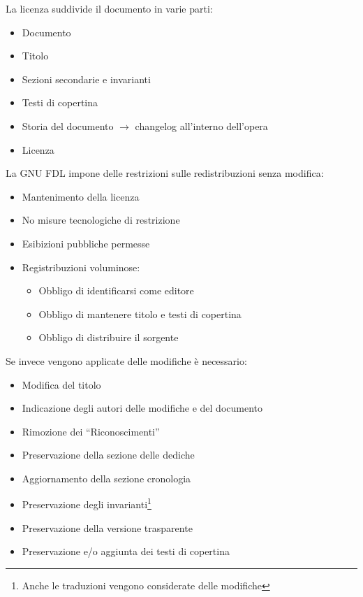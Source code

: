 La licenza suddivide il documento in varie parti:
\begin{itemize}
  
\item Documento
\item Titolo
\item Sezioni secondarie e invarianti
\item Testi di copertina
\item Storia del documento $\to$ changelog all'interno dell'opera
\item Licenza
  
\end{itemize}

La GNU FDL impone delle restrizioni sulle redistribuzioni senza modifica:
\begin{itemize}

\item Mantenimento della licenza
\item No misure tecnologiche di restrizione
\item Esibizioni pubbliche permesse
\item Registribuzioni voluminose:
  \begin{itemize}

  \item Obbligo di identificarsi come editore
  \item Obbligo di mantenere titolo e testi di copertina
  \item Obbligo di distribuire il sorgente

  \end{itemize}

\end{itemize}

Se invece vengono applicate delle modifiche \`e necessario:
\begin{itemize}

\item Modifica del titolo
\item Indicazione degli autori delle modifiche e del documento
\item Rimozione dei ``Riconoscimenti''
\item Preservazione della sezione delle dediche
\item Aggiornamento della sezione cronologia
\item Preservazione degli invarianti\footnote{Anche le traduzioni vengono considerate delle modifiche}
\item Preservazione della versione trasparente
\item Preservazione e/o aggiunta dei testi di copertina

\end{itemize}

